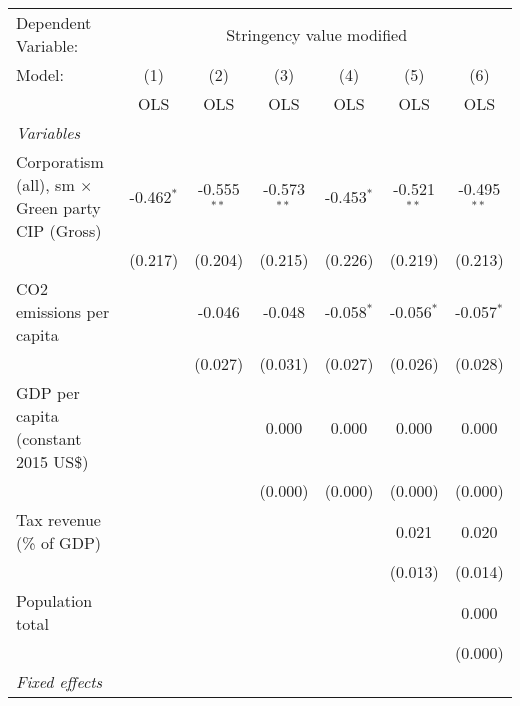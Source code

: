 
\begingroup
\centering
\begin{tabular}{lcccccc}
   \toprule
   Dependent Variable: & \multicolumn{6}{c}{Stringency value modified}\\
   Model:                                                  & (1)          & (2)           & (3)           & (4)          & (5)           & (6)\\  
                                                           &  OLS         & OLS           & OLS           & OLS          & OLS           & OLS\\  
   \midrule
   \emph{Variables}\\
   Corporatism (all), sm $\times$ Green party CIP (Gross)  & -0.462$^{*}$ & -0.555$^{**}$ & -0.573$^{**}$ & -0.453$^{*}$ & -0.521$^{**}$ & -0.495$^{**}$\\   
                                                           & (0.217)      & (0.204)       & (0.215)       & (0.226)      & (0.219)       & (0.213)\\   
   CO2 emissions per capita                                &              & -0.046        & -0.048        & -0.058$^{*}$ & -0.056$^{*}$  & -0.057$^{*}$\\   
                                                           &              & (0.027)       & (0.031)       & (0.027)      & (0.026)       & (0.028)\\   
   GDP per capita (constant 2015 US\$)                     &              &               & 0.000         & 0.000        & 0.000         & 0.000\\   
                                                           &              &               & (0.000)       & (0.000)      & (0.000)       & (0.000)\\   
   Tax revenue (\% of GDP)                                 &              &               &               &              & 0.021         & 0.020\\   
                                                           &              &               &               &              & (0.013)       & (0.014)\\   
   Population total                                        &              &               &               &              &               & 0.000\\   
                                                           &              &               &               &              &               & (0.000)\\   
   \emph{Fixed effects}\\

\end{tabular}
